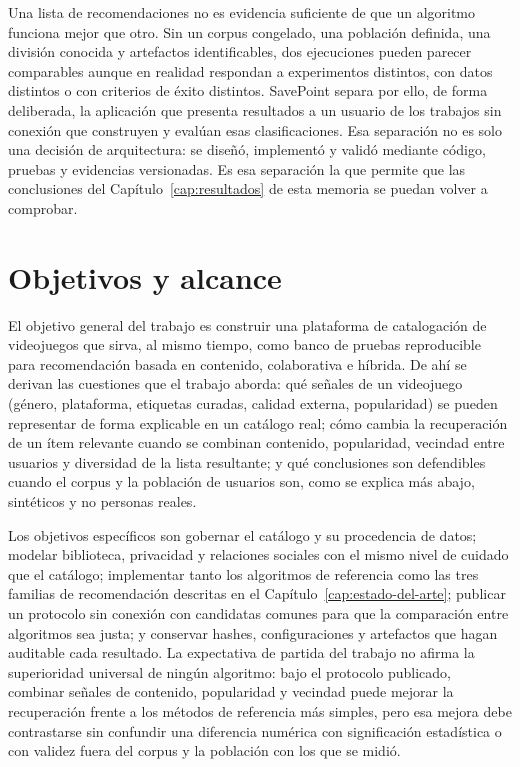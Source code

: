 Una lista de recomendaciones no es evidencia suficiente de que un algoritmo funciona mejor que
otro. Sin un corpus congelado, una población definida, una división conocida y artefactos
identificables, dos ejecuciones pueden parecer comparables aunque en realidad respondan a
experimentos distintos, con datos distintos o con criterios de éxito distintos. SavePoint
separa por ello, de forma deliberada, la aplicación que presenta resultados a un usuario de los
trabajos sin conexión que construyen y evalúan esas clasificaciones. Esa separación no es solo una decisión
de arquitectura: se diseñó, implementó y validó mediante código, pruebas y evidencias
versionadas. Es esa separación la que permite que las conclusiones del
Capítulo~\ref{cap:resultados} de esta memoria se puedan volver a comprobar.

\section{Objetivos y alcance}\label{sec:objetivos}\label{sec:alcance-limites}

El objetivo general del trabajo es construir una plataforma de catalogación de videojuegos que
sirva, al mismo tiempo, como banco de pruebas reproducible para recomendación basada en
contenido, colaborativa e híbrida. De ahí se derivan las cuestiones que el trabajo
aborda: qué señales de un videojuego (género, plataforma, etiquetas curadas, calidad
externa, popularidad) se pueden representar de forma explicable en un catálogo real; cómo
cambia la recuperación de un ítem relevante cuando se combinan contenido, popularidad,
vecindad entre usuarios y diversidad de la lista resultante; y qué conclusiones son
defendibles cuando el corpus y la población de usuarios son, como se explica más abajo,
sintéticos y no personas reales.

Los objetivos específicos son gobernar el catálogo y su procedencia de datos; modelar
biblioteca, privacidad y relaciones sociales con el mismo nivel de cuidado que el catálogo;
implementar tanto los algoritmos de referencia como las tres familias de
recomendación descritas en el Capítulo~\ref{cap:estado-del-arte}; publicar un protocolo sin conexión
con candidatas comunes para que la comparación entre algoritmos sea justa; y conservar hashes,
configuraciones y artefactos que hagan auditable cada resultado. La expectativa de partida del
trabajo no afirma la superioridad universal de ningún algoritmo: bajo el protocolo publicado,
combinar señales de contenido, popularidad y vecindad puede mejorar la recuperación frente a
los métodos de referencia más simples, pero esa mejora debe contrastarse sin confundir una diferencia
numérica con significación estadística o con validez fuera del corpus y la población con los
que se midió.

